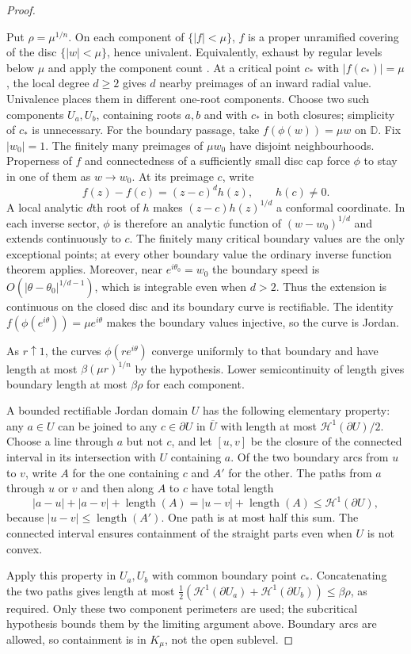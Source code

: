 \documentclass[11pt]{article}
\begin{document}
\begin{proof}
\hypertarget{perimeter-to-path}{}
Put $\rho=\mu^{1/n}$. On each component of $\{|f|<\mu\}$,
$f$ is a proper unramified covering of the disc $\{|w|<\mu\}$, hence
univalent. Equivalently, exhaust by regular levels below $\mu$ and apply
the component count \cite[proof of Proposition~2.1]{eks2010}.
At a critical point $c_*$ with
$|f(c_*)|=\mu$, the local degree $d\ge2$ gives $d$ nearby preimages of
an inward radial value. Univalence places them in different one-root
components. Choose two such components $U_a,U_b$, containing roots $a,b$
and with $c_*$ in both closures; simplicity of $c_*$ is unnecessary.
For the boundary passage, take $f(\phi(w))=\mu w$ on $\mathbb D$.
Fix $|w_0|=1$. The finitely many preimages of $\mu w_0$ have disjoint
neighbourhoods. Properness of $f$ and connectedness of a sufficiently
small disc cap force $\phi$ to stay in one of them as $w\to w_0$.
At its preimage $c$, write
\[
 f(z)-f(c)=(z-c)^d h(z),\qquad h(c)\ne0.
\]
A local analytic $d$th root of $h$ makes $(z-c)h(z)^{1/d}$ a conformal
coordinate. In each inverse sector, $\phi$ is therefore an analytic
function of $(w-w_0)^{1/d}$ and extends continuously to $c$.
The finitely many critical boundary values are the only exceptional
points; at every other boundary value the ordinary inverse function
theorem applies. Moreover, near $e^{i\theta_0}=w_0$ the boundary
speed is $O(|\theta-\theta_0|^{1/d-1})$, which is integrable even when
$d>2$. Thus the extension is continuous on the closed disc and its
boundary curve is rectifiable. The identity
$f(\phi(e^{i\theta}))=\mu e^{i\theta}$ makes the boundary values injective,
so the curve is Jordan.

As $r\uparrow1$, the curves $\phi(re^{i\theta})$ converge uniformly to
that boundary and have length at most $\beta(\mu r)^{1/n}$ by the
hypothesis. Lower semicontinuity of length gives boundary length at most
$\beta\rho$ for each component.

A bounded rectifiable Jordan domain $U$ has the following elementary
property: any $a\in U$ can be joined to any $c\in\partial U$ in
$\overline U$ with length at most $\mathcal H^1(\partial U)/2$.
Choose a line through $a$ but not $c$, and let $[u,v]$ be the closure
of the connected interval in its intersection with $U$ containing $a$.
Of the two boundary arcs from $u$ to $v$, write $A$ for the one containing
$c$ and $A'$ for the other. The paths from $a$ through $u$ or $v$ and
then along $A$ to $c$ have total length
\[
 |a-u|+|a-v|+\operatorname{length}(A)
 =|u-v|+\operatorname{length}(A)
 \le\mathcal H^1(\partial U),
\]
because $|u-v|\le\operatorname{length}(A')$. One path is at most half
this sum. The connected interval ensures containment of the straight
parts even when $U$ is not convex.

Apply this property in $U_a,U_b$ with common boundary point $c_*$.
Concatenating the two paths gives length at most
$\tfrac12(\mathcal H^1(\partial U_a)+\mathcal H^1(\partial U_b))
\le\beta\rho$, as required.
Only these two component perimeters are used; the subcritical hypothesis
bounds them by the limiting argument above. Boundary arcs are allowed,
so containment is in $K_\mu$, not the open sublevel.
\end{proof}
\end{document}
